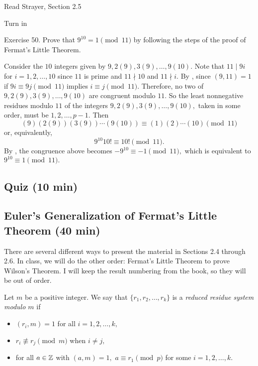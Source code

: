 \documentclass[letterpaper, 11 pt]{ximera}
\begin{document}
\begin{pre} \item[Read] Strayer, Section 2.5

    \item[Turn in]  
    
    Exercise 50. Prove that $9^{10} = 1\pmod{11}$ by following the steps of the proof of Fermat's Little Theorem.
    
    \begin{solution}
        Consider the $10$ integers given by $9,2(9), 3(9),\dots, 9(10).$ Note that $11\mid 9i$ for $i=1,2,\dots,10$ since $11$ is prime and $11\nmid 10$ and $11\nmid i.$ By , since $(9,11)=1$ if $9i\equiv 9j\pmod{11}$ implies $i\equiv j\pmod{11}.$ Therefore, no two of $9,2(9), 3(9),\dots, 9(10)$ are congruent modulo $11.$ So the least nonnegative residues modulo $11$ of the integers $9,2(9), 3(9),\dots, 9(10),$ taken in some order, must be $1,2,\dots, p-1.$ Then \[(9)(2(9)) (3(9))\cdots (9(10))\equiv (1)(2)\cdots (10)\pmod{11}\] or, equivalently, \[9^{10}10!\equiv 10!\pmod{11}.\] By , the congruence above becomes $-9^{10}\equiv -1\pmod{11},$ which is equivalent to $9^{10}\equiv 1\pmod{11}.$
    \end{solution}
\end{pre}
\subsection{Quiz (10 min)}

\subsection{Euler's Generalization of Fermat's Little Theorem (40 min)}

There are several different ways to present the material in Sections 2.4 through 2.6. In class, we will do the other order: Fermat's Little Theorem to prove Wilson's Theorem. I will keep the result numbering from the book, so they will be out of order.


\begin{defn}\label{defn:reduced-res-sys}
    Let $m$ be a positive integer. We say that $\{r_1,r_2,\dots,r_k\}$ is a \emph{reduced residue system modulo $m$} if 
    \begin{itemize}
        \item $(r_i,m)=1$ for all $i=1,2,\dots,k,$
        \item $r_i\not \equiv r_j \pmod {m}$ when $i\neq j,$
        \item for all $a\in\mathbb Z$ with $(a,m)=1,$ $a\equiv r_1\pmod{p}$ for some $i=1,2,\dots,k.$ 
    \end{itemize}
\end{defn}
\end{document}
